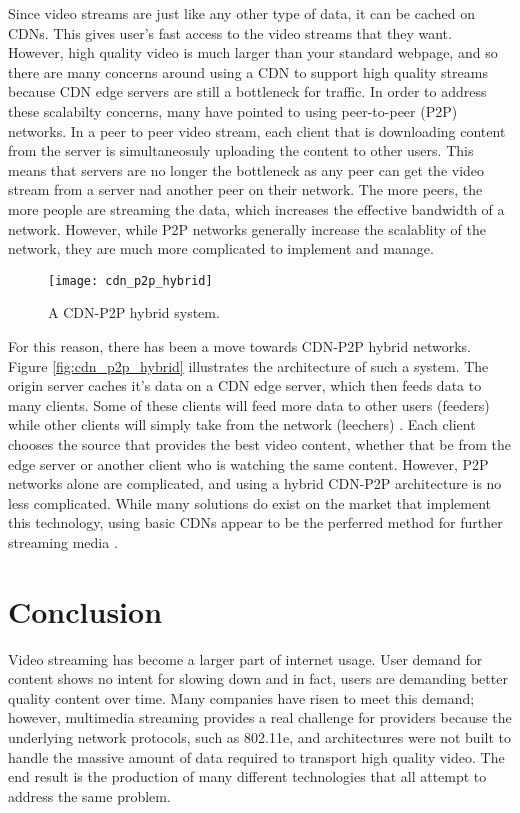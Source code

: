 \documentclass[12pt]{article}
\begin{document}
Since video streams are just like any other type of data, it can be cached on CDNs.  This gives user's fast access to the video streams that they want.  However, high quality video is much larger than your standard webpage, and so there are many concerns around using a CDN to support high quality streams \cite{6089062} because CDN edge servers are still a bottleneck for traffic.  In order to address these scalabilty concerns, many have pointed to using peer-to-peer (P2P) networks.  In a peer to peer video stream, each client that is downloading content from the server is simultaneosuly uploading the content to other users.  This means that servers are no longer the bottleneck as any peer can get the video stream from a server nad another peer on their network.  The more peers, the more people are streaming the data, which increases the effective bandwidth of a network.  However, while P2P networks generally increase the scalablity of the network, they are much more complicated to implement and manage.

\begin{figure}[h]
  \begin{center}
    \texttt{[image: cdn\_p2p\_hybrid]}
    \caption{A CDN-P2P hybrid system.}
    \label{fig:cdn_caching}
  \end{center}
\end{figure}

For this reason, there has been a move towards CDN-P2P hybrid networks.  Figure \ref{fig:cdn_p2p_hybrid} illustrates the architecture of such a system.  The origin server caches it's data on a CDN edge server, which then feeds data to many clients.  Some of these clients will feed more data to other users (feeders) while other clients will simply take from the network (leechers) \cite{6089062}.  Each client chooses the source that provides the best video content, whether that be from the edge server or another client who is watching the same content. However, P2P networks alone are complicated, and using a hybrid CDN-P2P architecture is no less complicated.  While many solutions do exist on the market that implement this technology, using basic CDNs appear to be the perferred method for further streaming media \cite{6089062}.

\section{Conclusion}
Video streaming has become a larger part of internet usage.  User demand for content shows no intent for slowing down and in fact, users are demanding better quality content over time.  Many companies have risen to meet this demand; however, multimedia streaming provides a real challenge for providers because the underlying network protocols, such as 802.11e, and architectures were not built to handle the massive amount of data required to transport high quality video.  The end result is the production of many different technologies that all attempt to address the same problem.
\end{document}

